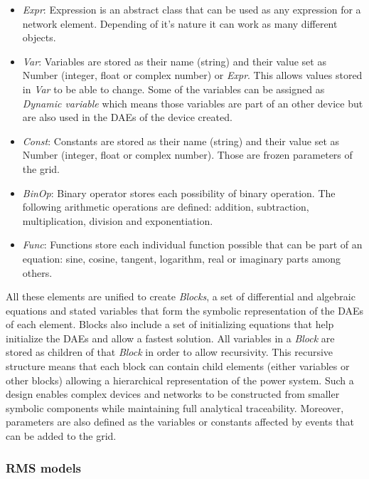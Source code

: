 \begin{itemize}
  \item \textit{Expr}: Expression is an abstract class that can be used as any expression for a network element. Depending of it's nature it can work as many different objects.
  \item \textit{Var}: Variables are stored as their name (string) and their value set as Number (integer, float or complex number) or \textit{Expr}. This allows values stored in
  \textit{Var} to be able to change. Some of the variables can be assigned as \textit{Dynamic variable} which means those variables are part of an other device but are also used in
  the DAEs of the device created.
  \item \textit{Const}: Constants are stored as their name (string) and their value set as Number (integer, float or complex number). Those are frozen parameters of the grid.
  \item \textit{BinOp}: Binary operator stores each possibility of binary operation. The following arithmetic operations are defined: addition, subtraction, multiplication, division and exponentiation.
  \item \textit{Func}: Functions store each individual function possible that can be part of an equation: sine, cosine, tangent, logarithm, real or imaginary parts among others.
\end{itemize}

All these elements are unified to create \textit{Blocks}, a set of differential and algebraic equations and stated variables that form the symbolic representation of the DAEs of each
element. Blocks also include a set of initializing equations that help initialize the DAEs and allow a fastest solution. All variables in a \textit{Block} are stored as 
children of that \textit{Block} in order to allow recursivity. This recursive structure means that each block can contain child elements (either variables or 
other blocks) allowing a hierarchical representation of the power system. Such a design enables complex devices and networks to be constructed from smaller symbolic components 
while maintaining full analytical traceability. Moreover, parameters are also defined as the variables or constants affected by events that can be added to the grid.

\subsubsection{RMS models}

